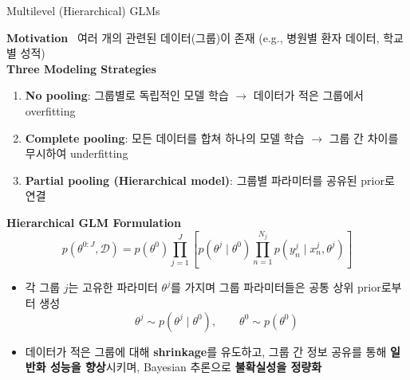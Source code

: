 \documentclass[xcolor=dvipsnames,t,9pt]{beamer}
\begin{document}
\begin{frame}{Multilevel (Hierarchical) GLMs}

    \textbf{Motivation} \, 여러 개의 관련된 데이터(그룹)이 존재 (e.g., 병원별 환자 데이터, 학교별 성적)\\
    \vspace{0.5em}
    \textbf{Three Modeling Strategies}
    \begin{enumerate}
        \item \textbf{No pooling}: 그룹별로 독립적인 모델 학습 \(\rightarrow\) 데이터가 적은 그룹에서 overfitting
        \item \textbf{Complete pooling}: 모든 데이터를 합쳐 하나의 모델 학습 \(\rightarrow\) 그룹 간 차이를 무시하여 underfitting
        \item \textbf{Partial pooling (Hierarchical model)}:
        그룹별 파라미터를 공유된 prior로 연결
    \end{enumerate}
    \vspace{0.3em}
    \textbf{Hierarchical GLM Formulation}
    \[
    p(\theta^{0:J}, \mathcal{D})
    = p(\theta^0)
    \prod_{j=1}^{J}
    \left[
        p(\theta^j \mid \theta^0)
        \prod_{n=1}^{N_j}
        p\!\left(y_n^j \mid x_n^j, \theta^j\right)
    \right]
    \] \vspace{-0.3em}
    \begin{itemize}
        \item 각 그룹 $j$는 고유한 파라미터 $\theta^j$를 가지며 그룹 파라미터들은 공통 상위 prior로부터 생성
        \[
        \theta^j \sim p(\theta^j \mid \theta^0), \qquad \theta^0 \sim p(\theta^0)
        \]
        \item 데이터가 적은 그룹에 대해 \textbf{shrinkage}를 유도하고, 그룹 간 정보 공유를 통해 \textbf{일반화 성능을 향상}시키며, Bayesian 추론으로 \textbf{불확실성을 정량화}
    \end{itemize}
    
\end{frame}

\end{document}
